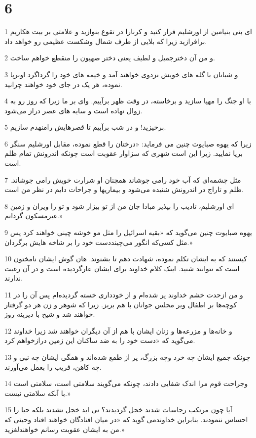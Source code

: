 \chapter{6}

\par 1 ای بنی بنیامین از اورشلیم فرار کنید و کرنارا در تقوع بنوازید و علامتی بر بیت هکاریم برافرازید زیرا که بلایی از طرف شمال وشکست عظیمی رو خواهد داد.
\par 2 و من آن دخترجمیل و لطیف یعنی دختر صهیون را منقطع خواهم ساخت.
\par 3 و شبانان با گله های خویش نزدوی خواهند آمد و خیمه های خود را گرداگرد اوبرپا نموده، هر یک در جای خود خواهند چرانید.
\par 4 با او جنگ را مهیا سازید و برخاسته، در وقت ظهر برآییم. وای بر ما زیرا که روز رو به زوال نهاده است و سایه های عصر دراز می‌شود.
\par 5 برخیزید! و در شب برآییم تا قصرهایش رامنهدم سازیم.
\par 6 زیرا که یهوه صبایوت چنین می فرماید: «درختان را قطع نموده، مقابل اورشلیم سنگر برپا نمایید. زیرا این است شهری که سزاوار عقوبت است چونکه اندرونش تمام ظلم است. 
\par 7 مثل چشمه‌ای که آب خود رامی جوشاند همچنان او شرارت خویش رامی جوشاند. ظلم و تاراج در اندرونش شنیده می‌شود و بیماریها و جراحات دایم در نظر من است.
\par 8 ‌ای اورشلیم، تادیب را بپذیر مبادا جان من از تو بیزار شود و تو را ویران و زمین غیرمسکون گردانم.»
\par 9 یهوه صبایوت چنین می‌گوید که «بقیه اسرائیل را مثل مو خوشه چینی خواهند کرد پس مثل کسی‌که انگور می‌چینددست خود را بر شاخه هایش برگردان.»
\par 10 کیستند که به ایشان تکلم نموده، شهادت دهم تا بشنوند. هان گوش ایشان نامختون است که نتوانند شنید. اینک کلام خداوند برای ایشان عارگردیده است و در آن رغبت ندارند.
\par 11 و من ازحدت خشم خداوند پر شده‌ام و از خودداری خسته گردیده‌ام پس آن را در کوچه‌ها بر اطفال وبر مجلس جوانان با هم بریز. زیرا که شوهر و زن هر دو گرفتار خواهند شد و شیخ با دیرینه روز.
\par 12 و خانه‌ها و مزرعه‌ها و زنان ایشان با هم از آن دیگران خواهند شد زیرا خداوند می‌گوید که «دست خود را به ضد ساکنان این زمین درازخواهم کرد.
\par 13 چونکه جمیع ایشان چه خرد وچه بزرگ، پر از طمع شده‌اند و همگی ایشان چه نبی و چه کاهن، فریب را بعمل می‌آورند.
\par 14 وجراحت قوم مرا اندک شفایی دادند، چونکه می‌گویند سلامتی است، سلامتی است با آنکه سلامتی نیست.»
\par 15 آیا چون مرتکب رجاسات شدند خجل گردیدند؟ نی ابد خجل نشدند بلکه حیا را احساس ننمودند. بنابراین خداوندمی گوید که «در میان افتادگان خواهند افتاد وحینی که من به ایشان عقوبت رسانم خواهندلغزید.»
